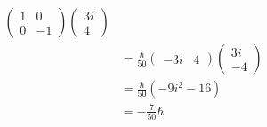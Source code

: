 \documentclass{homework}
\begin{document}
\begin{enumerate}
\begin{enumerate}
\begin{align*}
\begin{pmatrix}
						1 & 0 \\
						0 & -1
					\end{pmatrix} \begin{pmatrix}
					3i \\ 4
				\end{pmatrix} \\
				& = \frac{\hbar}{50} \begin{pmatrix}
					-3i & 4
				\end{pmatrix} \begin{pmatrix}
					3i \\ -4
				\end{pmatrix} \\
				& = \frac{\hbar}{50} \left(
					-9i^2 - 16
				\right) \\
				& = \boxed{ -\frac{7}{50}\hbar }
				\end{align*}
			

\end{enumerate}
\end{enumerate}
\end{document}
